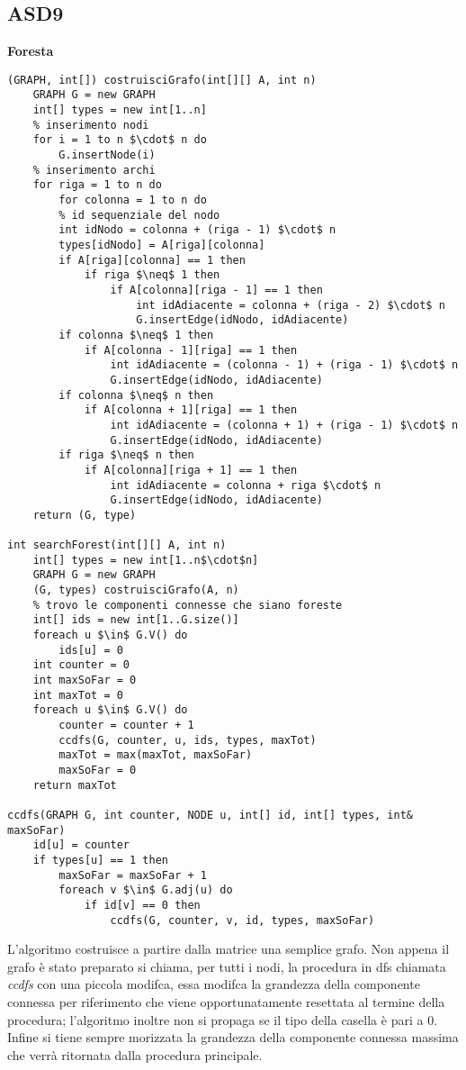 \documentclass[../cheatSheetAlgoritmi.tex]{subfiles}
\begin{document}
\subsection{ASD9}
\textbf{Foresta}
\begin{lstlisting}[caption=Foresta con costruzione del grafo]
(GRAPH, int[]) costruisciGrafo(int[][] A, int n)
	GRAPH G = new GRAPH
  	int[] types = new int[1..n]
  	% inserimento nodi
  	for i = 1 to n $\cdot$ n do
    	G.insertNode(i)
  	% inserimento archi
  	for riga = 1 to n do
    	for colonna = 1 to n do
      	% id sequenziale del nodo
      	int idNodo = colonna + (riga - 1) $\cdot$ n
      	types[idNodo] = A[riga][colonna]
      	if A[riga][colonna] == 1 then
        	if riga $\neq$ 1 then 
          		if A[colonna][riga - 1] == 1 then 
            		int idAdiacente = colonna + (riga - 2) $\cdot$ n
            		G.insertEdge(idNodo, idAdiacente)
        if colonna $\neq$ 1 then
          	if A[colonna - 1][riga] == 1 then 
            	int idAdiacente = (colonna - 1) + (riga - 1) $\cdot$ n
            	G.insertEdge(idNodo, idAdiacente)
        if colonna $\neq$ n then
          	if A[colonna + 1][riga] == 1 then 
            	int idAdiacente = (colonna + 1) + (riga - 1) $\cdot$ n
            	G.insertEdge(idNodo, idAdiacente)
        if riga $\neq$ n then
          	if A[colonna][riga + 1] == 1 then 
            	int idAdiacente = colonna + riga $\cdot$ n
            	G.insertEdge(idNodo, idAdiacente)
  	return (G, type)

int searchForest(int[][] A, int n)
	int[] types = new int[1..n$\cdot$n]
  	GRAPH G = new GRAPH
  	(G, types) costruisciGrafo(A, n)
  	% trovo le componenti connesse che siano foreste
  	int[] ids = new int[1..G.size()]
  	foreach u $\in$ G.V() do
  		ids[u] = 0
  	int counter = 0
 	int maxSoFar = 0
  	int maxTot = 0
  	foreach u $\in$ G.V() do
    	counter = counter + 1
    	ccdfs(G, counter, u, ids, types, maxTot)
    	maxTot = max(maxTot, maxSoFar) 
    	maxSoFar = 0
  	return maxTot

ccdfs(GRAPH G, int counter, NODE u, int[] id, int[] types, int& maxSoFar)
	id[u] = counter
  	if types[u] == 1 then
  		maxSoFar = maxSoFar + 1
 		foreach v $\in$ G.adj(u) do
    		if id[v] == 0 then
      			ccdfs(G, counter, v, id, types, maxSoFar)
\end{lstlisting}
L'algoritmo costruisce a partire dalla matrice una semplice grafo. Non appena il grafo è stato preparato si chiama, per tutti i nodi, la procedura in dfs chiamata \textit{ccdfs} con una piccola modifca, essa modifca la grandezza della componente connessa per riferimento che viene opportunatamente resettata al termine della procedura; l'algoritmo inoltre non si propaga se il tipo della casella è pari a 0. Infine si tiene sempre morizzata la grandezza della componente connessa massima che verrà ritornata dalla procedura principale.
\end{document}
